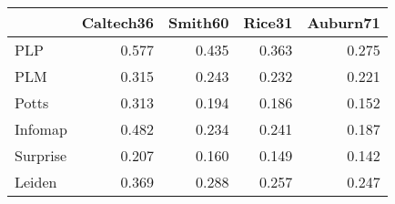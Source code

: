 \begin{tabular}{lrrrr}
\toprule
{} & Caltech36 & Smith60 & Rice31 & Auburn71 \\
\midrule
PLP      &     0.577 &   0.435 &  0.363 &    0.275 \\
PLM      &     0.315 &   0.243 &  0.232 &    0.221 \\
Potts    &     0.313 &   0.194 &  0.186 &    0.152 \\
Infomap  &     0.482 &   0.234 &  0.241 &    0.187 \\
Surprise &     0.207 &   0.160 &  0.149 &    0.142 \\
Leiden   &     0.369 &   0.288 &  0.257 &    0.247 \\
\bottomrule
\end{tabular}
